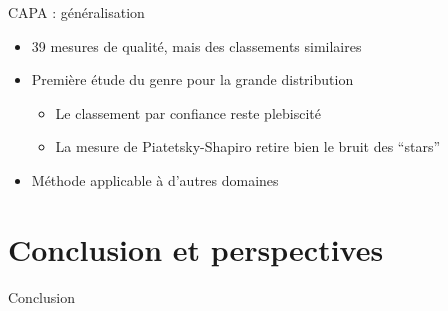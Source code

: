\documentclass[table]{beamer}
\providecommand{\capa}{\mbox{\textsc{CAPA}} }
\begin{document}
\begin{frame}{\capa : généralisation}
  \begin{itemize}
    \item 39 mesures de qualité, mais des classements similaires
    \vspace{1em}
    \item Première étude du genre pour la grande distribution
    \begin{itemize}
      \item Le classement par confiance reste plebiscité
      \item La mesure de Piatetsky-Shapiro retire bien le bruit des ``stars''
    \end{itemize}
    \vspace{1em}
    \item Méthode applicable à d'autres domaines
  \end{itemize}
\end{frame}







\section{Conclusion et perspectives}

{
\begin{frame}{}
  Conclusion
\end{frame}
}
\end{document}
